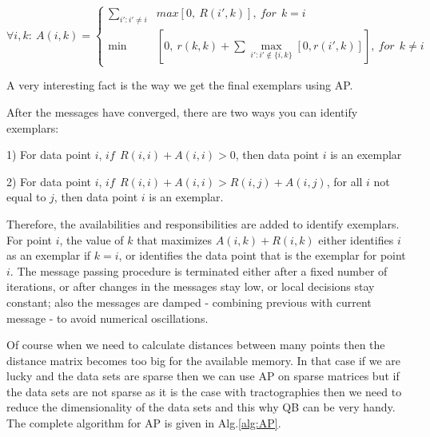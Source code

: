 \documentclass[preprint,authoryear,a4paper,10pt,onecolumn]{elsarticle}
\begin{document}
\begin{equation}
\forall i,k:\: A(i,k)=\begin{cases}
{\displaystyle \sum_{i':i'\neq i}} & max[0,\: R(i',k)],\: for\:\: k=i\\
\min & \left[0,\: r(k,k)+{\displaystyle \sum\max_{i':i'\notin\{i,k\}}[0,r(i',k)]}\right],\: for\:\: k\neq i\end{cases}\end{equation}


A very interesting fact is the way we get the final exemplars using
AP. 

After the messages have converged, there are two ways you can identify
exemplars: 

1) For data point $i$, $if\:\: R(i,i)+A(i,i)>0$, then data point
$i$ is an exemplar 

2) For data point $i$, $if\:\: R(i,i)+A(i,i)>R(i,j)+A(i,j)$, for
all $i$ not equal to $j$, then data point $i$ is an exemplar. 

Therefore, the availabilities and responsibilities are added to identify
exemplars. For point $i$, the value of $k$ that maximizes $A(i,k)+R(i,k)$
either identifies $i$ as an exemplar if $k=i$, or identifies the
data point that is the exemplar for point $i$. The message passing
procedure is terminated either after a fixed number of iterations,
or after changes in the messages stay low, or local decisions stay
constant; also the messages are damped - combining previous with current
message - to avoid numerical oscillations. 

Of course when we need to calculate distances between many points
then the distance matrix becomes too big for the available memory.
In that case if we are lucky and the data sets are sparse then we
can use AP on sparse matrices but if the data sets are not sparse
as it is the case with tractographies then we need to reduce the dimensionality
of the data sets and this why QB can be very handy. The complete algorithm
for AP is given in Alg.\ref{alg:AP}.
\end{document}
